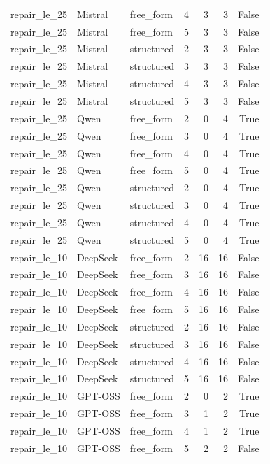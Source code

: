 \begin{longtable}{lllrrrr}
repair\_le\_25 & Mistral & free\_form & 4 & 3 & 3 & False \\
repair\_le\_25 & Mistral & free\_form & 5 & 3 & 3 & False \\
repair\_le\_25 & Mistral & structured & 2 & 3 & 3 & False \\
repair\_le\_25 & Mistral & structured & 3 & 3 & 3 & False \\
repair\_le\_25 & Mistral & structured & 4 & 3 & 3 & False \\
repair\_le\_25 & Mistral & structured & 5 & 3 & 3 & False \\
repair\_le\_25 & Qwen & free\_form & 2 & 0 & 4 & True \\
repair\_le\_25 & Qwen & free\_form & 3 & 0 & 4 & True \\
repair\_le\_25 & Qwen & free\_form & 4 & 0 & 4 & True \\
repair\_le\_25 & Qwen & free\_form & 5 & 0 & 4 & True \\
repair\_le\_25 & Qwen & structured & 2 & 0 & 4 & True \\
repair\_le\_25 & Qwen & structured & 3 & 0 & 4 & True \\
repair\_le\_25 & Qwen & structured & 4 & 0 & 4 & True \\
repair\_le\_25 & Qwen & structured & 5 & 0 & 4 & True \\
repair\_le\_10 & DeepSeek & free\_form & 2 & 16 & 16 & False \\
repair\_le\_10 & DeepSeek & free\_form & 3 & 16 & 16 & False \\
repair\_le\_10 & DeepSeek & free\_form & 4 & 16 & 16 & False \\
repair\_le\_10 & DeepSeek & free\_form & 5 & 16 & 16 & False \\
repair\_le\_10 & DeepSeek & structured & 2 & 16 & 16 & False \\
repair\_le\_10 & DeepSeek & structured & 3 & 16 & 16 & False \\
repair\_le\_10 & DeepSeek & structured & 4 & 16 & 16 & False \\
repair\_le\_10 & DeepSeek & structured & 5 & 16 & 16 & False \\
repair\_le\_10 & GPT-OSS & free\_form & 2 & 0 & 2 & True \\
repair\_le\_10 & GPT-OSS & free\_form & 3 & 1 & 2 & True \\
repair\_le\_10 & GPT-OSS & free\_form & 4 & 1 & 2 & True \\
repair\_le\_10 & GPT-OSS & free\_form & 5 & 2 & 2 & False \\

\end{longtable}
